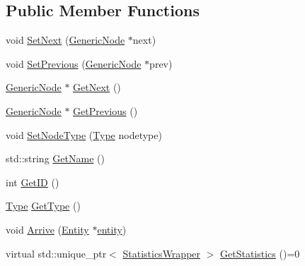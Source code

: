 \subsection*{Public Member Functions}
\begin{DoxyCompactItemize}
\item 
void \hyperlink{class_generic_node_ab627bbdbaaef832b9b79199bac113422}{Set\+Next} (\hyperlink{class_generic_node}{Generic\+Node} $\ast$next)
\item 
void \hyperlink{class_generic_node_a3b03496c103efe7e504f77e22abf851d}{Set\+Previous} (\hyperlink{class_generic_node}{Generic\+Node} $\ast$prev)
\item 
\hyperlink{class_generic_node}{Generic\+Node} $\ast$ \hyperlink{class_generic_node_aae0ee4c56b5478de7a6790cab2df7adb}{Get\+Next} ()
\item 
\hyperlink{class_generic_node}{Generic\+Node} $\ast$ \hyperlink{class_generic_node_a58305c86cd4f8f46909ba022eb010587}{Get\+Previous} ()
\item 
void \hyperlink{class_generic_node_a793b15e284a17095c013015049628a03}{Set\+Node\+Type} (\hyperlink{class_generic_node_a9e7985ab9bbfa1c85091adc0ab71a6b6}{Type} nodetype)
\item 
std\+::string \hyperlink{class_generic_node_aaf9d163658172370e01ef5da113b66e0}{Get\+Name} ()
\item 
int \hyperlink{class_generic_node_aa73c27d677012efdcda65f7908c77758}{Get\+ID} ()
\item 
\hyperlink{class_generic_node_a9e7985ab9bbfa1c85091adc0ab71a6b6}{Type} \hyperlink{class_generic_node_a270cafd4814f236ad503b02cd99339e0}{Get\+Type} ()
\item 
void \hyperlink{class_generic_node_a923a359d019dc5a97a3da74aa33e2761}{Arrive} (\hyperlink{class_entity}{Entity} $\ast$\hyperlink{_entity_8h_ad79a57ed3105eb60d991a1aeb4a9dc44a428e8fcd53019fa239fa3419261e499e}{entity})
\item 
virtual std\+::unique\+\_\+ptr$<$ \hyperlink{class_generic_node_1_1_statistics_wrapper}{Statistics\+Wrapper} $>$ \hyperlink{class_generic_node_ae7c8424c8c14fd3de993c902d78deb67}{Get\+Statistics} ()=0
\end{DoxyCompactItemize}
